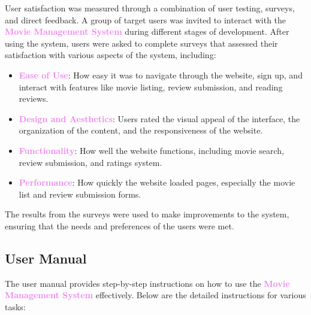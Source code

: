 \documentclass[a4paper,12pt]{article}  %
\renewcommand{\textbf}[1]{\textcolor{violet}{\bfseries #1}}
\begin{document}
User satisfaction was measured through a combination of user testing, surveys, and direct feedback. A group of target users was invited to interact with the \textbf{Movie Management System} during different stages of development. After using the system, users were asked to complete surveys that assessed their satisfaction with various aspects of the system, including:

\begin{itemize}
    \item \textbf{Ease of Use}: How easy it was to navigate through the website, sign up, and interact with features like movie listing, review submission, and reading reviews.
    \item \textbf{Design and Aesthetics}: Users rated the visual appeal of the interface, the organization of the content, and the responsiveness of the website.
    \item \textbf{Functionality}: How well the website functions, including movie search, review submission, and ratings system.
    \item \textbf{Performance}: How quickly the website loaded pages, especially the movie list and review submission forms.
\end{itemize}

The results from the surveys were used to make improvements to the system, ensuring that the needs and preferences of the users were met.

\subsection{User Manual}

The user manual provides step-by-step instructions on how to use the \textbf{Movie Management System} effectively. Below are the detailed instructions for various tasks:
\end{document}
